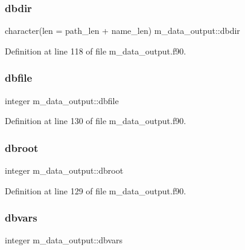 \subsubsection{\texorpdfstring{dbdir}{dbdir}}
{\footnotesize\ttfamily character(len = path\+\_\+len + name\+\_\+len) m\+\_\+data\+\_\+output\+::dbdir}



Definition at line 118 of file m\+\_\+data\+\_\+output.\+f90.

\mbox{\label{namespacem__data__output_aec51d3900a580048a3c9f5bddfa38ed2}} 
\subsubsection{\texorpdfstring{dbfile}{dbfile}}
{\footnotesize\ttfamily integer m\+\_\+data\+\_\+output\+::dbfile}



Definition at line 130 of file m\+\_\+data\+\_\+output.\+f90.

\mbox{\label{namespacem__data__output_a5cd7e79fd8f57db6362eeae681f8a9d8}} 
\subsubsection{\texorpdfstring{dbroot}{dbroot}}
{\footnotesize\ttfamily integer m\+\_\+data\+\_\+output\+::dbroot}



Definition at line 129 of file m\+\_\+data\+\_\+output.\+f90.

\mbox{\label{namespacem__data__output_acc04177c6c6ab23be61767b187ece0ba}} 
\subsubsection{\texorpdfstring{dbvars}{dbvars}}
{\footnotesize\ttfamily integer m\+\_\+data\+\_\+output\+::dbvars}



